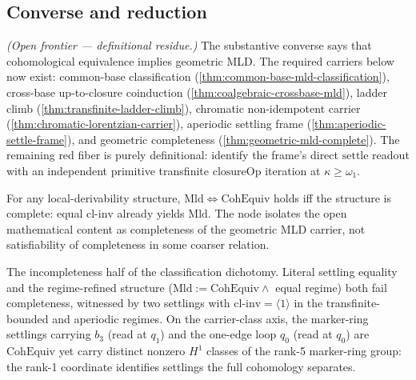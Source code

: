 \subsection{Converse and reduction}

\begin{theorem}\label{thm:aperiodic-mld-classification}\notready{}
\emph{(Open frontier --- definitional residue.)} The substantive converse says
that cohomological equivalence implies geometric MLD.  The required carriers
below now exist: common-base classification
(\cref{thm:common-base-mld-classification}), cross-base up-to-closure
coinduction (\cref{thm:coalgebraic-crossbase-mld}), ladder climb
(\cref{thm:transfinite-ladder-climb}), chromatic non-idempotent carrier
(\cref{thm:chromatic-lorentzian-carrier}), aperiodic settling frame
(\cref{thm:aperiodic-settle-frame}), and geometric completeness
(\cref{thm:geometric-mld-complete}).  The remaining red fiber is purely
definitional: identify the frame's direct \(\mathrm{settle}\) readout with an
independent primitive transfinite \(\mathrm{closureOp}\) iteration at
\(\kappa\ge\omega_1\).
\end{theorem}

\begin{theorem}\label{thm:aperiodic-mld-classification-reduction}\leanok{}
For any local-derivability structure, \(\mathrm{Mld}\iff\mathrm{CohEquiv}\)
holds iff the structure is complete: equal \(\mathrm{cl\text{-}inv}\) already
yields \(\mathrm{Mld}\).  The node isolates the open mathematical content as
completeness of the geometric MLD carrier, not satisfiability of completeness in
some coarser relation.
\end{theorem}

\begin{theorem}\label{thm:classification-incompleteness}\leanok{}
The incompleteness half of the classification dichotomy.  Literal settling
equality and the regime-refined structure (\(\mathrm{Mld}:=\mathrm{CohEquiv}
\wedge\) equal regime) both fail completeness, witnessed by two settlings with
\(\mathrm{cl\text{-}inv}=\langle 1\rangle\) in the transfinite-bounded and
aperiodic regimes.  On the carrier-class axis, the marker-ring settlings
carrying \(b_3\) (read at \(q_1\)) and the one-edge loop \(q_0\) (read at
\(q_0\)) are \(\mathrm{CohEquiv}\) yet carry distinct nonzero \(H^1\) classes
of the rank-5 marker-ring group: the rank-1 coordinate identifies settlings the
full cohomology separates.
\end{theorem}
